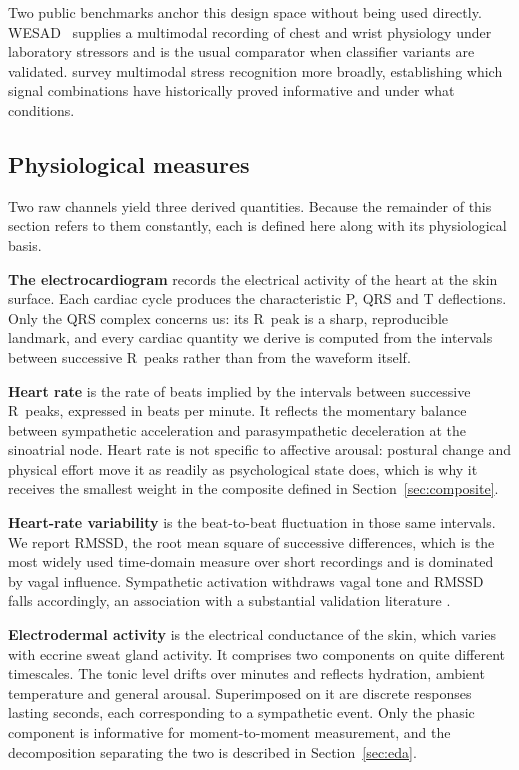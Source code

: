Two public benchmarks anchor this design space without being used
directly. WESAD~\citep{schmidt2018} supplies a multimodal
recording of chest and wrist physiology under laboratory stressors
and is the usual comparator when classifier variants are
validated. \citet{alberdi2016} survey multimodal stress
recognition more broadly, establishing which signal combinations
have historically proved informative and under what conditions.

\subsection{Physiological measures}
\label{sec:measures}

Two raw channels yield three derived quantities. Because the
remainder of this section refers to them constantly, each is
defined here along with its physiological basis.

\textbf{The electrocardiogram} records the electrical activity of
the heart at the skin surface. Each cardiac cycle produces the
characteristic P, QRS and T deflections. Only the QRS complex
concerns us: its R~peak is a sharp, reproducible landmark, and
every cardiac quantity we derive is computed from the intervals
between successive R~peaks rather than from the waveform itself.

\textbf{Heart rate} is the rate of beats implied by the intervals
between successive R~peaks, expressed in beats per minute. It
reflects the momentary balance between sympathetic acceleration
and parasympathetic deceleration at the sinoatrial node. Heart
rate is not specific to affective arousal: postural change and
physical effort move it as readily as psychological state does,
which is why it receives the smallest weight in the composite
defined in Section~\ref{sec:composite}.

\textbf{Heart-rate variability} is the beat-to-beat fluctuation
in those same intervals. We report RMSSD, the root mean square of
successive differences, which is the most widely used
time-domain measure over short recordings and is dominated by
vagal influence. Sympathetic activation withdraws vagal tone and
RMSSD falls accordingly, an association with a substantial
validation literature \citep{taskforce1996, thayer2012, kim2018}.

\textbf{Electrodermal activity} is the electrical conductance of
the skin, which varies with eccrine sweat gland activity. It
comprises two components on quite different timescales. The tonic
level drifts over minutes and reflects hydration, ambient
temperature and general arousal. Superimposed on it are discrete
responses lasting seconds, each corresponding to a sympathetic
event. Only the phasic component is informative for
moment-to-moment measurement, and the decomposition separating
the two is described in Section~\ref{sec:eda}.

